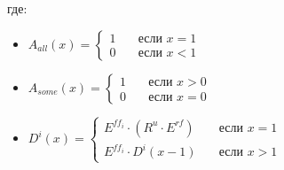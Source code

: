 \documentclass{article}
\begin{document}
  где:
  \begin{itemize}
    \item[] $A_{all}(x) = 
              \begin{cases}
                1 & \quad \text{если } x = 1 \\
                0 & \quad \text{если } x < 1
              \end{cases}
            $
    \item[] $A_{some}(x) = 
              \begin{cases}
                1 & \quad \text{если } x > 0 \\
                0 & \quad \text{если } x = 0
              \end{cases}
            $
    \item[] $D^{i}(x) = 
              \begin{cases}
                E^{ff_{i}} \cdot (R^{u} \cdot E^{rf}) & \quad \text{если } x = 1 \\
                E^{ff_{i}} \cdot D^{i}(x - 1) & \quad \text{если } x > 1
              \end{cases}
            $
  \end{itemize}
\end{document}
